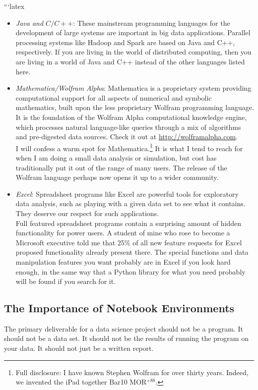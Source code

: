\documentclass[10pt]{article}
\begin{document}
```latex
\begin{itemize}
  \item \textit{Java and $C / C++$}: These mainstream programming languages for the development of large systems are important in big data applications. Parallel processing systems like Hadoop and Spark are based on Java and C++, respectively. If you are living in the world of distributed computing, then you are living in a world of Java and C++ instead of the other languages listed here.
  \item \textit{Mathematica/Wolfram Alpha}: Mathematica is a proprietary system providing computational support for all aspects of numerical and symbolic mathematics, built upon the less proprietary Wolfram programming language. It is the foundation of the Wolfram Alpha computational knowledge engine, which processes natural language-like queries through a mix of algorithms and pre-digested data sources. Check it out at \href{http://wolframalpha.com}{http://wolframalpha.com}.\\
I will confess a warm spot for Mathematica.\footnote{Full disclosure: I have known Stephen Wolfram for over thirty years. Indeed, we invented the iPad together Bar10 MOR$^{+88}$.} It is what I tend to reach for when I am doing a small data analysis or simulation, but cost has traditionally put it out of the range of many users. The release of the Wolfram language perhaps now opens it up to a wider community.
  \item \textit{Excel}: Spreadsheet programs like Excel are powerful tools for exploratory data analysis, such as playing with a given data set to see what it contains. They deserve our respect for such applications.\\
Full featured spreadsheet programs contain a surprising amount of hidden functionality for power users. A student of mine who rose to become a Microsoft executive told me that 25\% of all new feature requests for Excel proposed functionality already present there. The special functions and data manipulation features you want probably are in Excel if you look hard enough, in the same way that a Python library for what you need probably will be found if you search for it.
\end{itemize}

\subsection*{The Importance of Notebook Environments}
The primary deliverable for a data science project should not be a program. It should not be a data set. It should not be the results of running the program on your data. It should not just be a written report.
\end{document}

